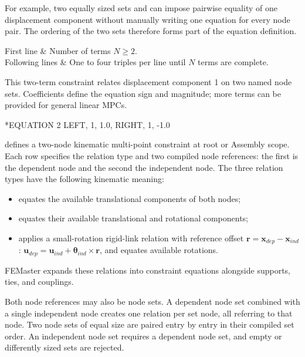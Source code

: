 For example, two equally sized sets  and  can impose pairwise equality of one displacement component without manually writing one equation for every node pair. The ordering of the two sets therefore forms part of the equation definition.

\begin{keyworddata}
First line & Number of terms \(N\ge2\). \\
Following lines & One to four  triples per line until \(N\) terms are complete. \\
\end{keyworddata}

This two-term constraint relates displacement component 1 on two named node sets. Coefficients define the equation sign and magnitude; more terms can be provided for general linear MPCs.

\exampleheading
\begin{inputdeck}
*EQUATION
2
LEFT, 1, 1.0, RIGHT, 1, -1.0
\end{inputdeck}


 defines a two-node kinematic multi-point constraint at root
or Assembly scope. Each row specifies the relation type and two compiled
node references: the first is the dependent node and the second the
independent node. The three relation types have the following kinematic meaning:
\begin{itemize}
  \item {} equates the available translational components of both nodes;
  \item {} equates their available translational and rotational components;
  \item {} applies a small-rotation rigid-link relation with reference offset \(\boldsymbol r=\boldsymbol x_{dep}-\boldsymbol x_{ind}\): \(\boldsymbol u_{dep}=\boldsymbol u_{ind}+\boldsymbol\theta_{ind}\times\boldsymbol r\), and equates available rotations.
\end{itemize}
FEMaster expands these relations into constraint equations alongside supports, ties, and couplings.

Both node references may also be node sets. A dependent node set combined with a single independent node creates one relation per set node, all referring to that node. Two node sets of equal size are paired entry by entry in their compiled set order. An independent node set requires a dependent node set, and empty or differently sized sets are rejected.

